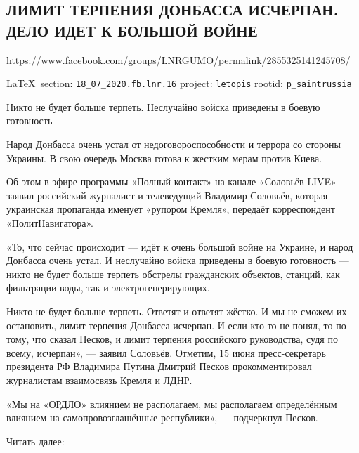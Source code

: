  
 

\subsection{ЛИМИТ ТЕРПЕНИЯ ДОНБАССА ИСЧЕРПАН. ДЕЛО ИДЕТ К БОЛЬШОЙ ВОЙНЕ}
\url{https://www.facebook.com/groups/LNRGUMO/permalink/2855325141245708/}
  
\vspace{0.5cm}
{\small\LaTeX~section: \verb|18_07_2020.fb.lnr.16| project: \verb|letopis| rootid: \verb|p_saintrussia|}
\vspace{0.5cm}

Никто не будет больше терпеть. Неслучайно войска приведены в боевую готовность

Народ Донбасса очень устал от недоговороспособности и террора со стороны Украины.
В свою очередь Москва готова к жестким мерам против Киева.

Об этом в эфире программы «Полный контакт» на канале «Соловьёв LIVE» заявил российский журналист и телеведущий Владимир Соловьёв, которая украинская пропаганда именует «рупором Кремля», передаёт корреспондент «ПолитНавигатора».

«То, что сейчас происходит --- идёт к очень большой войне на Украине, и народ Донбасса очень устал.
И неслучайно войска приведены в боевую готовность --- никто не будет больше терпеть обстрелы гражданских объектов, станций, как фильтрации воды, так и электрогенерирующих.

Никто не будет больше терпеть. Ответят и ответят жёстко.
И мы не сможем их остановить, лимит терпения Донбасса исчерпан.
И если кто-то не понял, то по тому, что сказал Песков, и лимит терпения российского руководства, судя по всему, исчерпан», --- заявил Соловьёв.
Отметим, 15 июня пресс-секретарь президента РФ Владимира Путина Дмитрий Песков прокомментировал журналистам взаимосвязь Кремля и ЛДНР.

«Мы на «ОРДЛО» влиянием не располагаем, мы располагаем определённым влиянием на самопровозглашённые республики», --- подчеркнул Песков.

Читать далее:  
